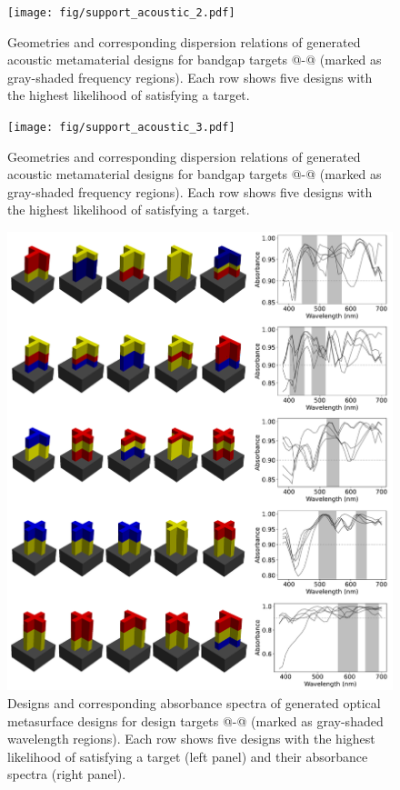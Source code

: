 \documentclass{article}
\makeatletter
\newcommand*{\rom}[1]{\expandafter\@slowromancap\romannumeral #1@}
\makeatother
\begin{document}
\begin{appendices}
\begin{figure}
\centering
\texttt{[image: fig/support\_acoustic\_2.pdf]}
\caption{Geometries and corresponding dispersion relations of generated acoustic metamaterial designs for bandgap targets \rom{5}-\rom{7} (marked as gray-shaded frequency regions). Each row shows five designs with the highest likelihood of satisfying a target. 
}
\label{fig:support_acoustic_2}
\end{figure}

\begin{figure}
\centering
\texttt{[image: fig/support\_acoustic\_3.pdf]}
\caption{Geometries and corresponding dispersion relations of generated acoustic metamaterial designs for bandgap targets \rom{8}-\rom{10} (marked as gray-shaded frequency regions). Each row shows five designs with the highest likelihood of satisfying a target. 
}
\label{fig:support_acoustic_3}
\end{figure}

\begin{figure}
\centering
\includegraphics[width=\textwidth]{fig/support_optical_1.pdf}
\caption{Designs and corresponding absorbance spectra of generated optical metasurface designs for design targets \rom{2}-\rom{6} (marked as gray-shaded wavelength regions). Each row shows five designs with the highest likelihood of satisfying a target (left panel) and their absorbance spectra (right panel). 
}
\label{fig:support_optical_1}
\end{figure}


\end{appendices}
\end{document}
